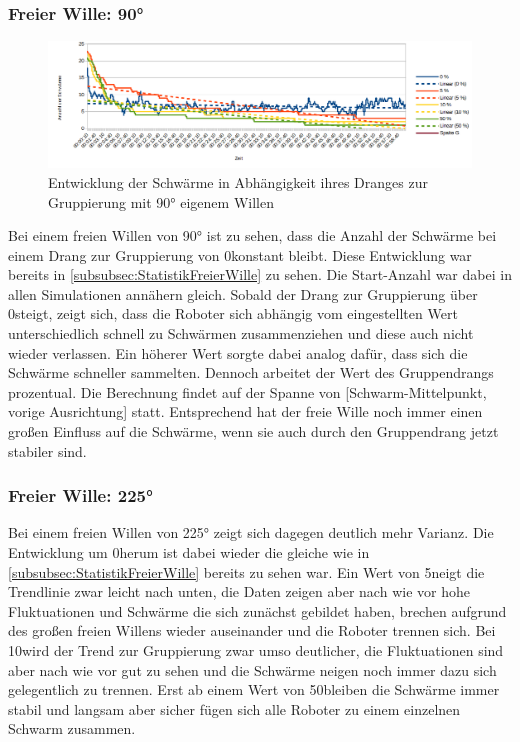 \subsubsection*{Freier Wille: 90°}

\begin{figure}[h]
	\includegraphics[width=\textwidth, height=\statisticHeight]{graphics/Statistics/FlockGeneral/LocalRange1Speed01FreeWill90.png}
	\caption{Entwicklung der Schwärme in Abhängigkeit ihres Dranges zur Gruppierung mit 90° eigenem Willen}
	\label{pic:GeneralFlockStatistic2}
\end{figure}

Bei einem freien Willen von 90° ist zu sehen, dass die Anzahl der Schwärme bei einem Drang zur Gruppierung von 0\per konstant bleibt. Diese Entwicklung war bereits in \autoref{subsubsec:StatistikFreierWille} zu sehen. Die Start-Anzahl war dabei in allen Simulationen annähern gleich.
Sobald der Drang zur Gruppierung über 0\per steigt, zeigt sich, dass die Roboter sich abhängig vom eingestellten Wert unterschiedlich schnell zu Schwärmen zusammenziehen und diese auch nicht wieder verlassen. Ein höherer Wert sorgte dabei analog dafür, dass sich die Schwärme schneller sammelten. Dennoch arbeitet der Wert des Gruppendrangs prozentual. Die Berechnung findet auf der Spanne von [Schwarm-Mittelpunkt, vorige Ausrichtung] statt. Entsprechend hat der freie Wille noch immer einen großen Einfluss auf die Schwärme, wenn sie auch durch den Gruppendrang jetzt stabiler sind.

\subsubsection*{Freier Wille: 225°}

Bei einem freien Willen von 225° zeigt sich dagegen deutlich mehr Varianz. Die Entwicklung um 0\per herum ist dabei wieder die gleiche wie in \autoref{subsubsec:StatistikFreierWille} bereits zu sehen war. Ein Wert von 5\per neigt die Trendlinie zwar leicht nach unten, die Daten zeigen aber nach wie vor hohe Fluktuationen und Schwärme die sich zunächst gebildet haben, brechen aufgrund des großen freien Willens wieder auseinander und die Roboter trennen sich. Bei 10\per wird der Trend zur Gruppierung zwar umso deutlicher, die Fluktuationen sind aber nach wie vor gut zu sehen und die Schwärme neigen noch immer dazu sich gelegentlich zu trennen. Erst ab einem Wert von 50\per bleiben die Schwärme immer stabil und langsam aber sicher fügen sich alle Roboter zu einem einzelnen Schwarm zusammen.

